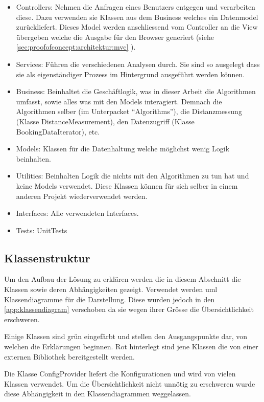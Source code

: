 \begin{itemize}
	\item Controllers: Nehmen die Anfragen eines Benutzers entgegen und verarbeiten diese. Dazu verwenden sie Klassen aus dem Business welches ein Datenmodel zurückliefert. Dieses Model werden anschliessend vom Controller an die View übergeben welche die Ausgabe für den Browser generiert (siehe \cref{sec:proofofconcept:architektur:mvc} ).
	\item Services: Führen die verschiedenen Analysen durch. Sie sind so ausgelegt dass sie als eigenständiger Prozess im Hintergrund ausgeführt werden können.
	\item Business: Beinhaltet die Geschäftlogik, was in dieser Arbeit die Algorithmen umfasst, sowie alles was mit den Models interagiert. Demnach die Algorithmen selber (im Unterpacket "`Algorithms"'), die Distanzmessung (Klasse DistanceMeasurement), den Datenzugriff (Klasse BookingDataIterator), etc.
	\item Models: Klassen für die Datenhaltung welche möglichst wenig Logik beinhalten.
	\item Utilities: Beinhalten Logik die nichts mit den Algorithmen zu tun hat und keine Models verwendet. Diese Klassen können für sich selber in einem anderen Projekt wiederverwendet werden.
	\item Interfaces: Alle verwendeten Interfaces.
	\item Tests: UnitTests
\end{itemize}

\subsection{Klassenstruktur}
\label{sec:proofofconcept:klassenstruktur}
Um den Aufbau der Lösung zu erklären werden die in diesem Abschnitt die Klassen sowie deren Abhängigkeiten gezeigt. Verwendet werden \gls{uml} Klassendiagramme für die Darstellung. Diese wurden jedoch in den \cref{app:klassendiagram} verschoben da sie wegen ihrer Grösse die Übersichtlichkeit erschweren.

Einige Klassen sind grün eingefärbt und stellen den Ausgangspunkte dar, von welchen die Erklärungen beginnen. Rot hinterlegt sind jene Klassen die von einer externen Bibliothek bereitgestellt werden.

Die Klasse ConfigProvider liefert die Konfigurationen und wird von vielen Klassen verwendet. Um die Übersichtlichkeit nicht unnötig zu erschweren wurde diese Abhängigkeit in den Klassendiagrammen weggelassen. 

